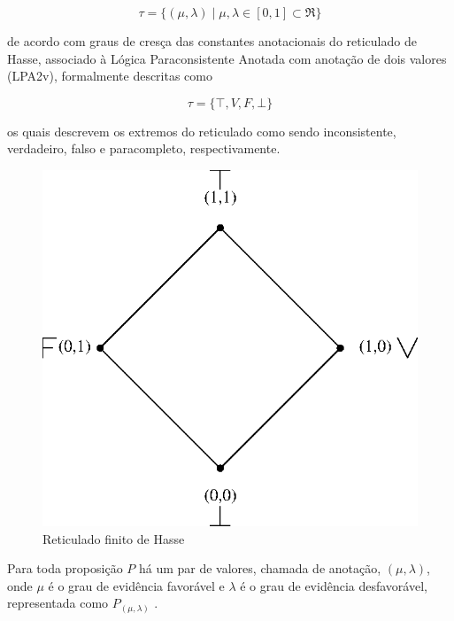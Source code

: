 \begin{center}
\begin{equation}
\tau = \{ ( \mu , \lambda ) \mid \mu ,\lambda \in [0,1] \subset \Re \}
\end{equation}
\end{center}

de acordo com graus de cresça das constantes anotacionais do reticulado de Hasse, associado à Lógica Paraconsistente Anotada com anotação de dois valores (LPA2v), formalmente descritas como 

\begin{center}
\begin{equation}
  \tau = \{ \top , V, F, \bot \}
\end{equation}
\end{center}

os quais descrevem os extremos do reticulado como sendo inconsistente, verdadeiro, falso e paracompleto, respectivamente. 

\begin{figure}[!htb]
\center\includegraphics[scale=1.0]{./pic/C421reticuladoHasse.eps}
\caption{Reticulado finito de Hasse}
\label{fig:reticuladoHasse}
\end{figure}

Para toda proposição $P$ há um par de valores, chamada de anotação, $(\mu , \lambda )$, onde $\mu$ é o grau de evidência favorável e $\lambda $ é o grau de evidência desfavorável, representada como  $P_{( \mu , \lambda )}$ .

